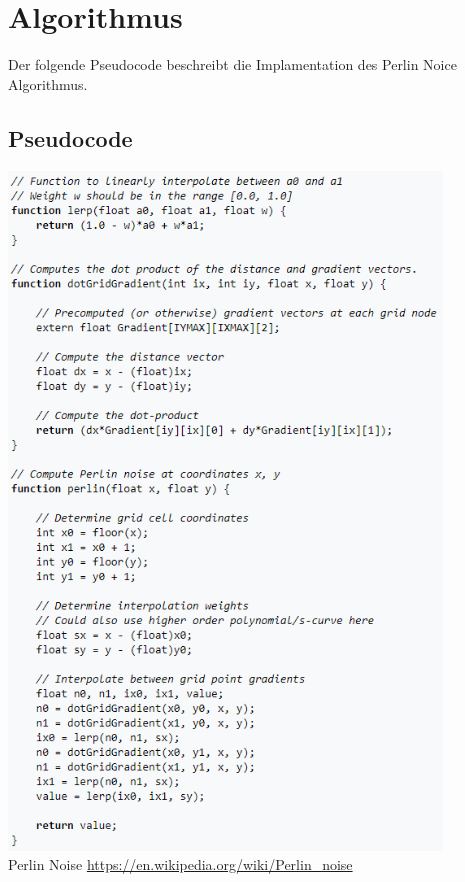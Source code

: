 \documentclass[a4paper]{article}
\begin{document}

	\section{Algorithmus}
	Der folgende Pseudocode beschreibt die Implamentation des \glqq Perlin Noice\grqq{} Algorithmus.


	\subsection{Pseudocode}

	\includegraphics[height=18cm]{pseudo_code.png} \\
	Perlin Noise \url{https://en.wikipedia.org/wiki/Perlin_noise} \\


\end{document}
